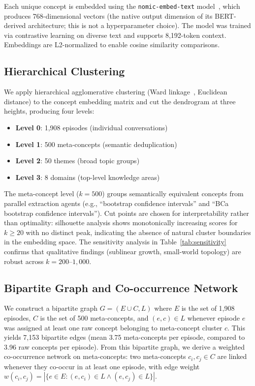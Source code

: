 \documentclass{svproc}
\begin{document}
Each unique concept is embedded using the
\texttt{nomic-embed-text} model~\cite{nussbaum2024nomic}, which produces
768-dimensional vectors (the native output dimension of its BERT-derived
architecture; this is not a hyperparameter choice). The model was trained
via contrastive learning on diverse text and supports 8,192-token context.
Embeddings are L2-normalized to enable cosine similarity comparisons.

\subsection{Hierarchical Clustering}
\label{sec:clustering}

We apply hierarchical agglomerative clustering (Ward
linkage~\cite{ward1963hierarchical}, Euclidean distance) to the concept embedding
matrix and cut the dendrogram at three heights, producing four levels:

\begin{itemize}
    \item \textbf{Level 0}: 1,908 episodes (individual conversations)
    \item \textbf{Level 1}: 500 meta-concepts (semantic deduplication)
    \item \textbf{Level 2}: 50 themes (broad topic groups)
    \item \textbf{Level 3}: 8 domains (top-level knowledge areas)
\end{itemize}

\noindent The meta-concept level ($k = 500$) groups semantically equivalent
concepts from parallel extraction agents (e.g., ``bootstrap confidence
intervals'' and ``BCa bootstrap confidence intervals''). Cut points are chosen
for interpretability rather than optimality: silhouette analysis shows
monotonically increasing scores for $k \geq 20$ with no distinct peak,
indicating the absence of natural cluster boundaries in the embedding space.
The sensitivity analysis in Table~\ref{tab:sensitivity} confirms that
qualitative findings (sublinear growth, small-world topology) are robust
across $k = 200$--$1{,}000$.

\subsection{Bipartite Graph and Co-occurrence Network}

We construct a bipartite graph $G = (E \cup C, L)$ where $E$ is the set of
1,908 episodes, $C$ is the set of 500 meta-concepts, and $(e, c) \in L$
whenever episode $e$ was assigned at least one raw concept belonging to
meta-concept cluster $c$. This yields 7,153 bipartite edges (mean 3.75
meta-concepts per episode, compared to 3.96 raw concepts per episode). From this bipartite graph, we derive a weighted
co-occurrence network on meta-concepts: two meta-concepts $c_i, c_j \in C$
are linked whenever they co-occur in at least one episode, with edge weight
$w(c_i, c_j) = |\{e \in E : (e, c_i) \in L \wedge (e, c_j) \in L\}|$.
\end{document}
